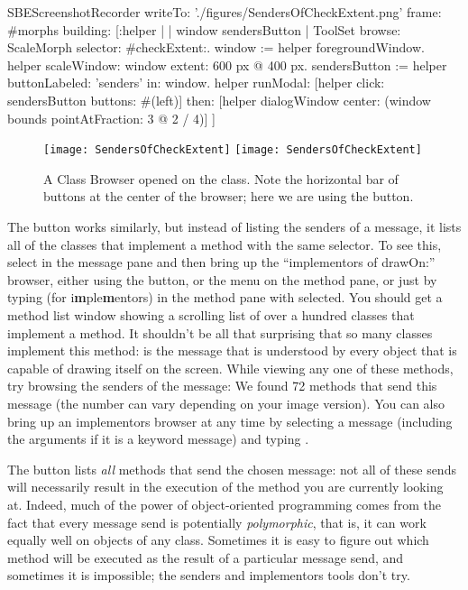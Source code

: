 \documentclass[a4paper,10pt,twoside]{book}
\begin{document}
\begin{ExecuteSmalltalkScript}
SBEScreenshotRecorder writeTo: './figures/SendersOfCheckExtent.png' frame: #morphs building: [:helper |
	| window sendersButton |
	ToolSet browse: ScaleMorph selector: #checkExtent:.
	window := helper foregroundWindow.
	helper scaleWindow: window extent: 600 px @ 400 px.
	sendersButton := helper buttonLabeled: 'senders' in: window.
	helper
		runModal: [helper click: sendersButton buttons: #(left)]
		then: [helper dialogWindow center: (window bounds pointAtFraction: 3 @ 2 / 4)]
]
\end{ExecuteSmalltalkScript}
\begin{figure}[htbp]
	\begin{center}
   \ifluluelse
		{\texttt{[image: SendersOfCheckExtent]}}
		{\texttt{[image: SendersOfCheckExtent]}}
	\end{center}
	\caption{A Class Browser opened on the  class. Note the horizontal bar of buttons at the center of the browser; here we are using the  button.}
	\label{fig:SendersOfCheckExtent}
\end{figure}

The  button works similarly, but instead of listing the senders of a message, it lists all of the classes that implement a method with the same selector.
To see this, select  in the message pane and then bring up the ``implementors of drawOn:'' browser, either using the  button, or the  menu on the method pane, or just by typing  (for {i\textbf{m}ple\textbf{m}entors}) in the method pane with  selected.
You should get a method list window showing a scrolling list of over a hundred classes that implement a  method.
It shouldn't be all that surprising that so many classes implement this method:
 is the message that is understood by every object that is capable of drawing itself on the screen.
While viewing any one of these methods, try browsing the senders of the  message:
We found 72 methods that send this message (the number can vary depending on your image version).
You can also bring up an implementors browser at any time by selecting a message (including the arguments if it is a keyword message) and typing .

The  button lists \emph{all} methods that send the chosen message: not all of these sends will necessarily result in the execution of the method you are currently looking at.
Indeed, much of the power of object-oriented programming comes from the fact that every message send is potentially \emph{polymorphic}, that is, it can work equally well on objects of any class.
Sometimes it is easy to figure out which method will be executed as the result of a particular message send, and sometimes it is impossible; the senders and implementors tools don't try.
\end{document}
